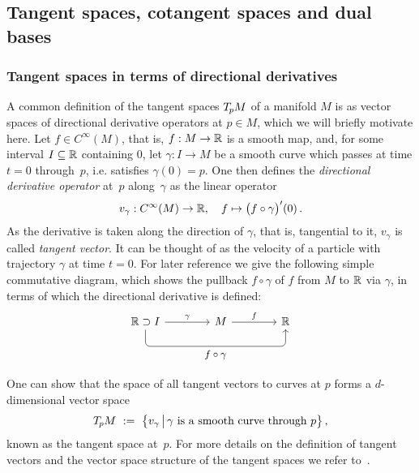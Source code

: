 \subsection{Tangent spaces, cotangent spaces and dual bases}
\label{apx:tangent_cotangent_dual_bases}

\subsubsection{Tangent spaces in terms of directional derivatives}
A common definition of the tangent spaces $T_{\mkern-1.5mu p}\mkern-.5muM$ of a manifold $M$ is as vector spaces of directional derivative operators at $p \in M$, which we will briefly motivate here.
Let $f\in C^\infty(M)$, that is, $f:M\to\mathbb{R}$ is a smooth map, and, for some interval $I\subseteq\mathbb{R}$ containing $0$, let $\gamma: I \to M$ be a smooth curve which passes at time $t = 0$ through~$p$, i.e. satisfies $\gamma(0) = p$.
One then defines the \emph{directional derivative operator} at~$p$ along~$\gamma$ as the linear operator
\begin{align}\label{eq:tangent_vector_directional_derivative}
    v_\gamma: C^\infty(M) \to \mathbb{R},\ \ \ f \mapsto \big(f \circ \gamma \big)'(0) \,.
\end{align}
As the derivative is taken along the direction of $\gamma$, that is, tangential to it, $v_\gamma$ is called \emph{tangent vector}.
It can be thought of as the velocity of a particle with trajectory $\gamma$ at time $t=0$.
For later reference we give the following simple commutative diagram, which shows the pullback $f\circ\gamma$ of $f$ from $M$ to $\mathbb{R}$ via $\gamma$, in terms of which the directional derivative is defined:
\begin{equation}\label{cd:directional_derivative}
    \begin{tikzcd}[row sep=2.5em, column sep=4em]
          \R \supset I
                \arrow[r, "\gamma"]
                \arrow[rr, rounded corners, to path={ 
                        |- node[below, pos=.75]{\small$f \circ \gamma$} ([yshift=-3.5ex]\tikztotarget.south)
                        -- (\tikztotarget.south)
                        }]
        & M     \arrow[r, "f"]
        & \R
    \end{tikzcd}
\end{equation}

One can show that the space of all tangent vectors to curves at $p$ forms a $d$-dimensional vector space
\begin{align}
    T_{\mkern-1.5mu p}\mkern-.5muM\ :=\ \big\{ v_\gamma \,\big|\, \gamma\ \text{is a smooth curve through}\ p \big\} \,,
\end{align}
known as the tangent space at~$p$.
For more details on the definition of tangent vectors and the vector space structure of the tangent spaces we refer to~\cite{schullerGeometricalAnatomy2016}.

